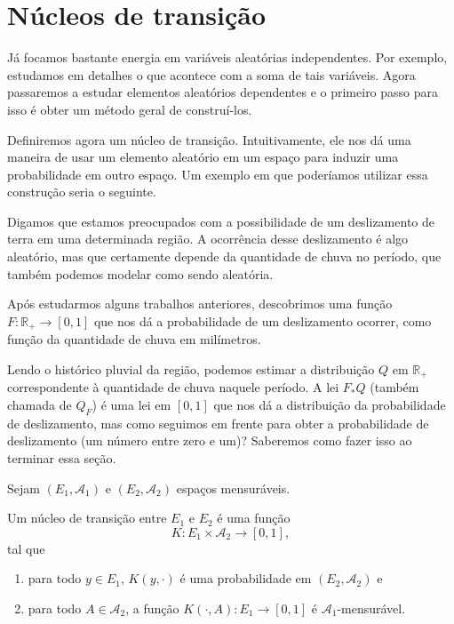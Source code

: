 
\section{Núcleos de transição}

Já focamos bastante energia em variáveis aleatórias independentes.
Por exemplo, estudamos em detalhes o que acontece com a soma de tais variáveis.
Agora passaremos a estudar elementos aleatórios dependentes e o primeiro passo para isso é obter um método geral de construí-los.

Definiremos agora um núcleo de transição.
Intuitivamente, ele nos dá uma maneira de usar um elemento aleatório em um espaço para induzir uma probabilidade em outro espaço.
Um exemplo em que poderíamos utilizar essa construção seria o seguinte.

Digamos que estamos preocupados com a possibilidade de um deslizamento de terra em uma determinada região.
A ocorrência desse deslizamento é algo aleatório, mas que certamente depende da quantidade de chuva no período, que também podemos modelar como sendo aleatória.

Após estudarmos alguns trabalhos anteriores, descobrimos uma função $F:\mathbb{R}_+ \to [0,1]$ que nos dá a probabilidade de um deslizamento ocorrer, como função da quantidade de chuva em milímetros.

Lendo o histórico pluvial da região, podemos estimar a distribuição $Q$ em $\mathbb{R}_+$ correspondente à quantidade de chuva naquele período.
A lei $F_* Q$ (também chamada de $Q_F$) é uma lei em $[0,1]$ que nos dá a distribuição da probabilidade de deslizamento, mas como seguimos em frente para obter a probabilidade de deslizamento (um número entre zero e um)?
Saberemos como fazer isso ao terminar essa seção.

Sejam $(E_1, \mathcal{A}_1)$ e $(E_2, \mathcal{A}_2)$ espaços mensuráveis.
\begin{definition}
  Um núcleo de transição entre $E_1$ e $E_2$ é uma função 
  \begin{equation}
    K: E_1 \times \mathcal{A}_2 \to [0,1],
  \end{equation}
  tal que
  \begin{enumerate}[\quad a)]
  \item para todo $y \in E_1$, $K(y,\cdot)$ é uma probabilidade em $(E_2, \mathcal{A}_2)$ e
  \item para todo $A \in \mathcal{A}_2$, a função $K(\cdot, A): E_1 \to [0,1]$ é $\mathcal{A}_1$-mensurável.
  \end{enumerate}
\end{definition}

